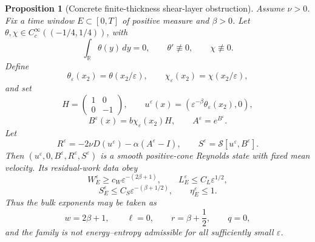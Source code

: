 \documentclass[10pt,a4paper]{amsart}
\newtheorem{proposition}{Proposition}
\newcommand{\Id}{I}
\newcommand{\R}{\mathbb R}
\begin{document}
\begin{proposition}[Concrete finite-thickness shear-layer obstruction]
\label{prop:concrete-layer}
Assume \(\nu>0\).  Fix a time window \(E\subset[0,T]\) of positive measure and
\(\beta>0\).  Let \(\theta,\chi\in C_c^\infty((-1/4,1/4))\), with
\[
  \int_{\R}\theta(y)\,dy=0,\qquad \theta'\not\equiv0,\qquad \chi\not\equiv0.
\]
Define
\[
  \theta_\varepsilon(x_2)=\theta(x_2/\varepsilon),\qquad
  \chi_\varepsilon(x_2)=\chi(x_2/\varepsilon),
\]
and set
\[
  H=\begin{pmatrix}1&0\\0&-1\end{pmatrix},\qquad
  u^\varepsilon(x)=
  \left(\varepsilon^{-\beta}\theta_\varepsilon(x_2),0\right),
\]
\[
  B^\varepsilon(x)=b\chi_\varepsilon(x_2)H,\qquad
  A^\varepsilon=e^{B^\varepsilon}.
\]
Let
\[
  R^\varepsilon=-2\nu D(u^\varepsilon)-\alpha(A^\varepsilon-\Id),
  \qquad
  S^\varepsilon=\mathcal S[u^\varepsilon,B^\varepsilon].
  \label{eq:concrete-defects}
\]
Then
\((u^\varepsilon,0,B^\varepsilon,R^\varepsilon,S^\varepsilon)\) is a smooth
positive-cone Reynolds state with fixed mean velocity.  Its residual-work data
obey
\[
  W_E^\varepsilon\ge c_W\varepsilon^{-(2\beta+1)},\qquad
  L_E^\varepsilon\le C_L\varepsilon^{1/2},
\]
\[
  S_E^\varepsilon\le C_S\varepsilon^{-(\beta+1/2)},\qquad
  \eta_E^\varepsilon\le1 .
\]
Thus the bulk exponents may be taken as
\[
  w=2\beta+1,\qquad \ell=0,\qquad r=\beta+\frac12,\qquad q=0,
\]
and the family is not energy--entropy admissible for all sufficiently small
\(\varepsilon\).
\end{proposition}
\end{document}
